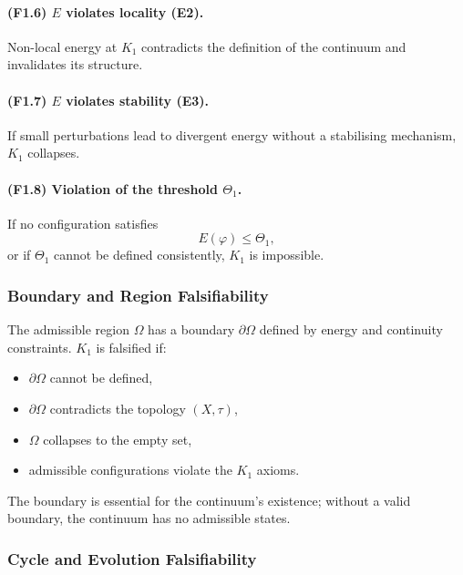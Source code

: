 \paragraph{(F1.6) \texorpdfstring{$E$}{E} violates locality (E2).}
Non-local energy at $K_1$ contradicts the definition of the continuum and
invalidates its structure.

\paragraph{(F1.7) \texorpdfstring{$E$}{E} violates stability (E3).}
If small perturbations lead to divergent energy without a stabilising
mechanism, $K_1$ collapses.

\paragraph{(F1.8) Violation of the threshold \texorpdfstring{$\Theta_1$}{\Theta_1}.}
If no configuration satisfies
\[
E(\varphi) \le \Theta_1,
\]
or if $\Theta_1$ cannot be defined consistently, $K_1$ is impossible.



\subsubsection{Boundary and Region Falsifiability}

The admissible region $\Omega$ has a boundary $\partial\Omega$ defined by
energy and continuity constraints.
$K_1$ is falsified if:

\begin{itemize}
    \item $\partial\Omega$ cannot be defined,
    \item $\partial\Omega$ contradicts the topology $(X,\tau)$,
    \item $\Omega$ collapses to the empty set,
    \item admissible configurations violate the $K_1$ axioms.
\end{itemize}

The boundary is essential for the continuum's existence; without a valid
boundary, the continuum has no admissible states.



\subsubsection{Cycle and Evolution Falsifiability}

